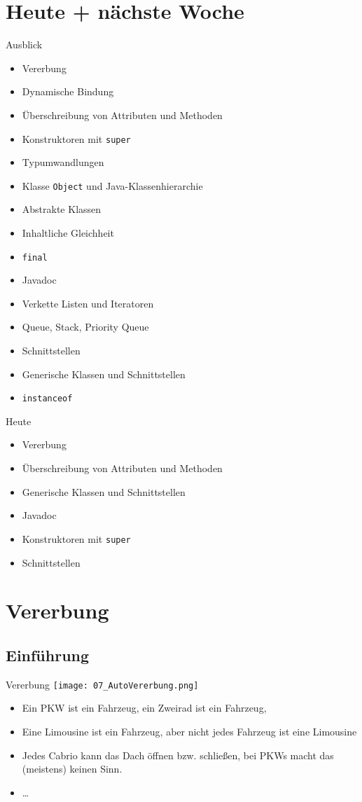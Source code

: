 \documentclass[18pt]{beamer}
\begin{document}
\section{Heute + nächste Woche}
\begin{frame}[fragile]{Ausblick}
\begin{itemize}
 \item Vererbung
 \item Dynamische Bindung
 \item Überschreibung von Attributen und Methoden
 \item Konstruktoren mit \verb|super|
 \item Typumwandlungen
 \item Klasse \verb|Object| und Java-Klassenhierarchie
 \item Abstrakte Klassen
 \item Inhaltliche Gleichheit
 \item \verb|final|
 \item Javadoc
 \item Verkette Listen und Iteratoren
 \item Queue, Stack, Priority Queue
 \item Schnittstellen
 \item Generische Klassen und Schnittstellen
  \item \verb|instanceof|
\end{itemize}
\end{frame}

\begin{frame}[fragile]{Heute}
\begin{itemize}
 \item Vererbung
 \item Überschreibung von Attributen und Methoden
 \item Generische Klassen und Schnittstellen
 \item Javadoc
 \item Konstruktoren mit \verb|super|
 \item Schnittstellen 
\end{itemize}
\end{frame}

\section{Vererbung}
\subsection{Einführung}
\begin{frame}{Vererbung}
 \texttt{[image: 07\_AutoVererbung.png]}
 \begin{itemize}
 \item Ein PKW ist ein Fahrzeug, ein Zweirad ist ein Fahrzeug, 
  \item Eine Limousine ist ein Fahrzeug, aber nicht jedes Fahrzeug ist eine Limousine
  \item Jedes Cabrio kann das Dach öffnen bzw. schließen, bei PKWs macht das (meistens) keinen Sinn.
  \item \ldots
 \end{itemize}
\end{frame}
\end{document}
